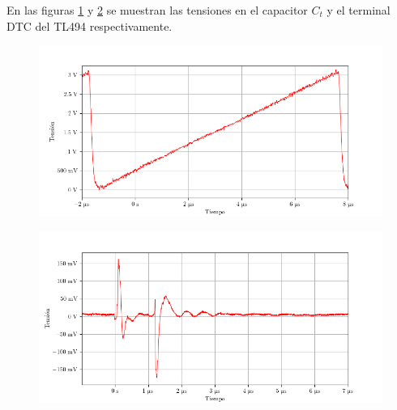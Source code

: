 En las figuras \ref{fig:ct_v} y \ref{fig:dtc_v} se muestran las tensiones en el capacitor $C_t$ y el terminal DTC del TL494 respectivamente.

\begin{figure}[H]
    \centering
    \includegraphics[width=\textwidth]{images/capturas-osciloscopio/TL494/Ct_v.png}
    \caption{} %
    \label{fig:ct_v}
\end{figure}


\begin{figure}[H]
    \centering
    \includegraphics[width=\textwidth]{images/capturas-osciloscopio/TL494/DTC_v.png}
    \caption{} %
    \label{fig:dtc_v}
\end{figure}



